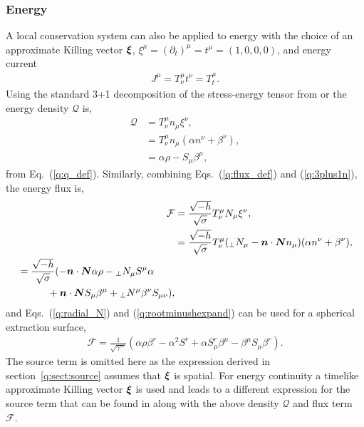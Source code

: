 \subsubsection{Energy} \label{q:sect:energy}
A local conservation system can also be applied to energy with the choice of an approximate Killing vector $\boldsymbol{\xi}$, $\xi^\mu = (\partial_t)^\mu = t^\mu =(1,0,0,0)$, and energy current
\begin{align}
\label{q:energycurrent} J^\mu = T^\mu_\nu t^\nu = T^\mu_t.
\end{align}
 Using the standard 3+1 decomposition of the stress-energy tensor from \cite{gourgoulhon20073+} or \cite{alcubierre2008introduction} the energy density $\mathcal{Q}$ is,
\begin{align}
\mathcal{Q} &= T^\mu_\nu n_\mu \xi^\nu, \\
            &= T^\mu_\nu n_\mu (\alpha n^\nu+ \beta^\nu), \\
            &= \alpha \rho - S_\mu \beta^\mu,
\end{align}
from Eq.~(\ref{q:q_def}). Similarly, combining Eqs.~(\ref{q:flux_def}) and (\ref{q:3plus1n}), the energy flux is,
\begin{align}\mathcal{F} &= \frac{\sqrt{-h}}{\sqrt{\sigma}}T^\mu_\nu N_\mu \xi^\nu, \\
            &= \frac{\sqrt{-h}}{\sqrt{\sigma}}T^\mu_\nu ({}_{\perp}N_\mu - \boldsymbol{n}\cdot \boldsymbol{N} n_\mu) (\alpha n^\nu + \beta^\nu), \\
    \begin{split} &= \frac{\sqrt{-h}}{\sqrt{\sigma}}(-\boldsymbol{n}\cdot \boldsymbol{N}\alpha\rho -  {}_{\perp}N_\mu S^\mu \alpha \\&\quad\quad\quad+ \boldsymbol{n}\cdot \boldsymbol{N} S_\mu \beta^\mu + {}_{\perp}N^\mu \beta^\nu S_{\mu\nu}), \end{split}
\end{align}
and Eqs.~(\ref{q:radial_N}) and (\ref{q:rootminushexpand}) can be used for a spherical extraction surface,
\begin{align}
 \mathcal{F} = \frac{1}{\sqrt{\gamma^{rr}}}(\alpha \rho \beta^r - \alpha^2 S^r   +  \alpha S^r_\mu\beta^\mu - \beta^\mu S_\mu \beta^r ).
\end{align}
 The source term is omitted here as the expression derived in section~\ref{q:sect:source} assumes that $\boldsymbol{\xi}$ is spatial. For energy continuity a timelike approximate Killing vector $\boldsymbol{\xi}$ is used and leads to a different expression for the source term that can be found in \cite{Clough_2021} along with the above density $\mathcal{Q}$ and flux term $\mathcal{F}$.
















